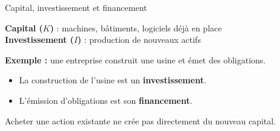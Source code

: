 \documentclass[aspectratio=169]{beamer}
\begin{document}
\begin{frame}[t]{Capital, investissement et financement}
\begin{defbox}
   \RaggedRight
      \textbf{Capital ($K$)} : machines, bâtiments, logiciels déjà en place\\[5pt]
      \textbf{Investissement ($I$)} : production de nouveaux actifs
   \end{defbox}
   \vspace{0.3cm}
   \textbf{Exemple :} une entreprise construit une usine et émet des obligations.
   \vspace{0.15cm}
   \begin{itemize}
      \setlength\itemsep{0.15cm}
      \item La construction de l'usine est un \textbf{investissement}.
      \item L'émission d'obligations est son \textbf{financement}.
   \end{itemize}
   \vspace{0.25cm}
   Acheter une action existante ne crée pas directement du nouveau capital.
\end{frame}
\end{document}
